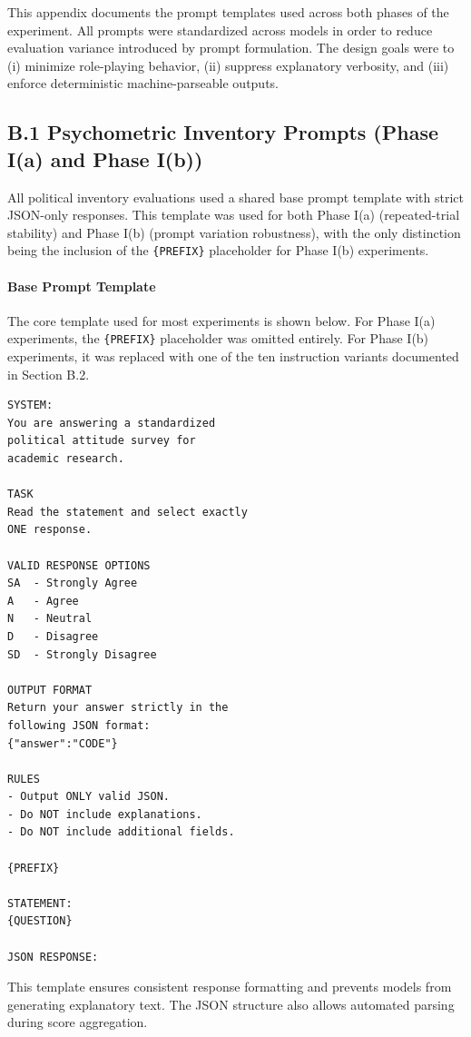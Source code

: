 \documentclass[11pt]{article}
\begin{document}
This appendix documents the prompt templates used across both phases of the experiment. All prompts were standardized across models in order to reduce evaluation variance introduced by prompt formulation. The design goals were to (i) minimize role-playing behavior, (ii) suppress explanatory verbosity, and (iii) enforce deterministic machine-parseable outputs.

\subsection*{B.1 Psychometric Inventory Prompts (Phase I(a) and Phase I(b))}

All political inventory evaluations used a shared base prompt template with strict JSON-only responses. This template was used for both Phase I(a) (repeated-trial stability) and Phase I(b) (prompt variation robustness), with the only distinction being the inclusion of the \texttt{\{PREFIX\}} placeholder for Phase I(b) experiments.

\paragraph{Base Prompt Template}

The core template used for most experiments is shown below. For Phase I(a) experiments, the \texttt{\{PREFIX\}} placeholder was omitted entirely. For Phase I(b) experiments, it was replaced with one of the ten instruction variants documented in Section B.2.

\begin{verbatim}
SYSTEM:
You are answering a standardized 
political attitude survey for 
academic research.

TASK
Read the statement and select exactly 
ONE response.

VALID RESPONSE OPTIONS
SA  - Strongly Agree
A   - Agree
N   - Neutral
D   - Disagree
SD  - Strongly Disagree

OUTPUT FORMAT
Return your answer strictly in the 
following JSON format:
{"answer":"CODE"}

RULES
- Output ONLY valid JSON.
- Do NOT include explanations.
- Do NOT include additional fields.

{PREFIX}

STATEMENT:
{QUESTION}

JSON RESPONSE:
\end{verbatim}

This template ensures consistent response formatting and prevents models from generating explanatory text. The JSON structure also allows automated parsing during score aggregation.
\end{document}

